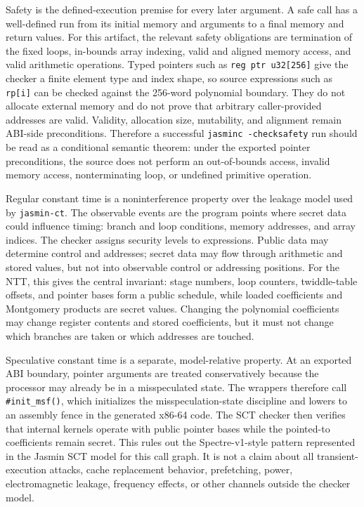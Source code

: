 \documentclass[10pt,twocolumn]{article}
\begin{document}
Safety is the defined-execution premise for every later argument.  A safe call
has a well-defined run from its initial memory and arguments to a final memory
and return values.  For this artifact, the relevant safety obligations are
termination of the fixed loops, in-bounds array indexing, valid and aligned
memory access, and valid arithmetic operations.  Typed pointers such as
\texttt{reg ptr u32[256]} give the checker a finite element type and index
shape, so source expressions such as \texttt{rp[i]} can be checked against the
256-word polynomial boundary.  They do not allocate external memory and do not
prove that arbitrary caller-provided addresses are valid.  Validity, allocation
size, mutability, and alignment remain ABI-side preconditions.  Therefore a
successful \texttt{jasminc -checksafety} run should be read as a conditional
semantic theorem: under the exported pointer preconditions, the source does not
perform an out-of-bounds access, invalid memory access, nonterminating loop, or
undefined primitive operation.

Regular constant time is a noninterference property over the leakage model used
by \texttt{jasmin-ct}.  The observable events are the program points where
secret data could influence timing: branch and loop conditions, memory
addresses, and array indices.  The
checker assigns security levels to expressions.  Public data may determine
control and addresses; secret data may flow through arithmetic and stored
values, but not into observable control or addressing positions.  For the NTT,
this gives the central invariant: stage numbers, loop counters, twiddle-table
offsets, and pointer bases form a public schedule, while loaded coefficients
and Montgomery products are secret values.  Changing the polynomial
coefficients may change register contents and stored coefficients, but it must
not change which branches are taken or which addresses are touched.

Speculative constant time is a separate, model-relative property.  At an
exported ABI boundary, pointer arguments are treated conservatively because the
processor may already be in a misspeculated state.  The wrappers therefore call
\texttt{\#init\_msf()}, which initializes the misspeculation-state discipline
and lowers to an assembly fence in the generated x86-64 code.  The SCT checker
then verifies that internal kernels operate with public pointer bases while the
pointed-to coefficients remain secret.  This rules out the Spectre-v1-style
pattern represented in the Jasmin SCT model for this call graph.  It is not a
claim about all transient-execution attacks, cache replacement behavior,
prefetching, power, electromagnetic leakage, frequency effects, or other
channels outside the checker model.
\end{document}
